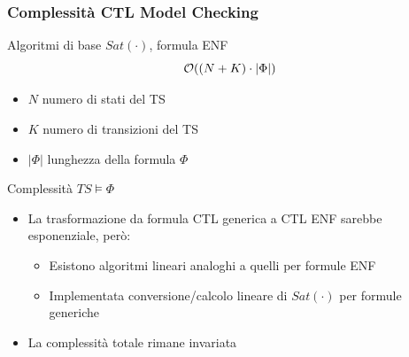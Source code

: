 \begin{frame}
  \frametitle{Complessit\`a \ac{CTL} Model Checking}
  \begin{block}{Algoritmi di base $Sat(\cdot)$, formula \ac{ENF}}
    $$
    \mathcal{O}((N+K)\cdot|\Phi|)
    $$
    \begin{itemize}
    \item $N$ numero di \alert{stati} del \ac{TS}
    \item $K$ numero di \alert{transizioni} del \ac{TS}
    \item $|\Phi|$ \alert{lunghezza} della formula $\Phi$
    \end{itemize}
  \end{block}
  \begin{block}{Complessit\`a $TS\models\Phi$}
    \begin{itemize}
    \item La trasformazione da formula \ac{CTL} generica a \ac{CTL}
      \ac{ENF} sarebbe \alert{esponenziale}, per\`o:
      \begin{itemize}
      \item Esistono algoritmi \alert{lineari} analoghi a quelli per formule \ac{ENF}
      \item Implementata conversione/calcolo \alert{lineare}
        di $Sat(\cdot)$ per formule generiche
      \end{itemize}
    \item La complessit\`a totale rimane \alert{invariata}
    \end{itemize}
  \end{block}
\end{frame}

